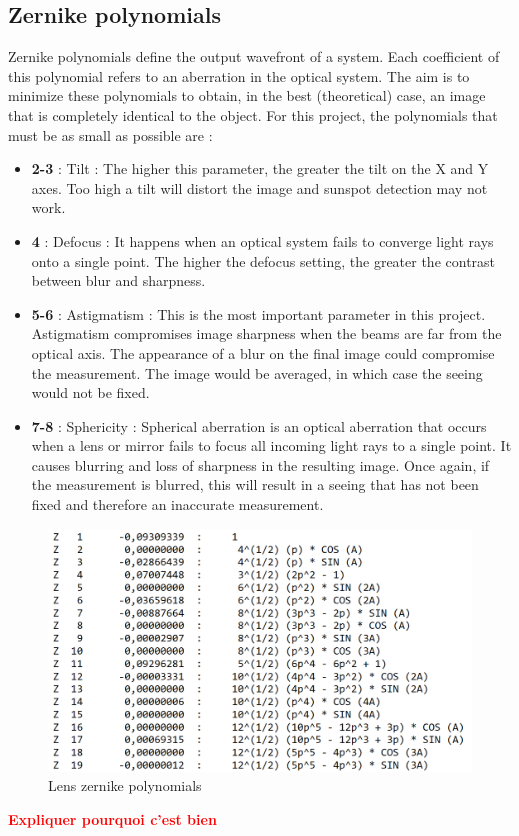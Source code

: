 \subsection{Zernike polynomials}
Zernike polynomials define the output wavefront of a system. Each coefficient of this polynomial refers to an
aberration in the optical system. The aim is to minimize these polynomials to obtain, in the best (theoretical)
case, an image that is completely identical to the object. For this project, the polynomials that must be as small as possible are :
\begin{itemize}
    \item \textbf{2-3} : Tilt : The higher this parameter, the greater the tilt on the X and Y axes. Too high a tilt will distort
          the image and sunspot detection may not work.
    \item \textbf{4}   : Defocus : It happens when an optical system fails to converge light rays onto a single point. The higher the
          defocus setting, the greater the contrast between blur and sharpness.
    \item \textbf{5-6} : Astigmatism : This is the most important parameter in this project. Astigmatism compromises image
          sharpness when the beams are far from the optical axis. The appearance of a blur on the final image could compromise the
          measurement. The image would be averaged, in which case the seeing would not be fixed.
    \item \textbf{7-8} : Sphericity : Spherical aberration is an optical aberration that occurs when a lens or mirror fails to focus all
          incoming light rays to a single point. It causes blurring and loss of sharpness in the resulting image. Once again, if the measurement
          is blurred, this will result in a seeing that has not been fixed and therefore an inaccurate measurement.
\end{itemize}
\begin{figure}[H]
    \centering
    \includegraphics[scale=0.7]{assets/figures/Optical Design/Zernike_Standard.png}
    \caption{Lens zernike polynomials}
    \label{fig:Opti_ZemaxZernik}
\end{figure}
\textbf{\textcolor{red}{Expliquer pourquoi c'est bien}}
